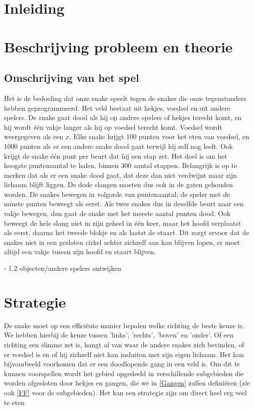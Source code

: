 \documentclass{article}
\begin{document}
\tableofcontents
\section{Inleiding}


\section{Beschrijving probleem en theorie}
\subsection{Omschrijving van het spel}
Het is de bedoeling dat onze snake speelt tegen de snakes die onze tegenstanders hebben geprogrammeerd. 
Het veld bestaat uit hekjes, voedsel en uit andere spelers. De snake gaat dood als hij op andere spelers of hekjes terecht komt, 
en hij wordt \'e\'en vakje langer als hij op voedsel terecht komt. Voedsel wordt weergegeven als een $x$. Elke snake krijgt 100 punten voor het eten van voedsel, 
en 1000 punten als er een andere snake dood gaat terwijl hij zelf nog leeft. Ook krijgt de snake \'e\'en punt per beurt dat hij een stap zet.
Het doel is om het hoogste puntenaantal te halen, binnen 300 aantal stappen. 
Belangrijk is op te merken dat als er een snake dood gaat, dat deze dan niet verdwijnt maar zijn lichaam blijft liggen. 
De dode slangen moeten dus ook in de gaten gehouden worden. 
De snakes bewegen in volgorde van puntenaantal; de speler met de minste punten beweegt als eerst. 
Als twee snakes dus in dezelfde beurt naar een vakje bewegen, dan gaat de snake met het meeste aantal punten dood. 
Ook beweegt de hele slang niet in zijn geheel in \'e\'en keer, maar het hoofd verplaatst als eerst, daarna het tweede blokje en als laatst de staart. 
Dit zorgt ervoor dat de snakes niet in een gesloten cirkel achter zichzelf aan kan blijven lopen, er moet altijd een vakje tussen zijn hoofd en staart blijven.

- 1.2 objecten/andere spelers ontwijken
\section{Strategie}
De snake moet op een effici\"ente manier bepalen welke richting de beste keuze is. We hebben hierbij de keuze tussen 'links', 'rechts', 'boven' en 'onder'. Of een richting een slimme zet is, hangt af van waar de andere snakes zich bevinden, of er voedsel is en of hij zichzelf niet kan insluiten met zijn eigen lichaam. Het kan bijvoorbeeld voorkomen dat er een doodlopende gang in een veld is. Om dit te kunnen voorspellen wordt het gebied opgedeeld in verschillende subgebieden die worden afgesloten door hekjes en gangen, die we in \ref{Gangen} zullen defini\"eren (zie ook \ref{FF} voor de subgebieden). Het kan een strategie zijn om direct heel erg veel te eten
\end{document}
